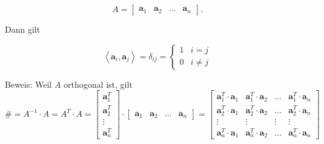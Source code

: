 \documentclass[10pt]{article}
\begin{document}
\[
A=\left[\begin{array}{llll}
\mathbf{a}_{1} & \mathbf{a}_{2} & \ldots & \mathbf{a}_{n} \tag{6.61}
\end{array}\right] .
\]

Dann gilt

\[
\left\langle\mathbf{a}_{i}, \mathbf{a}_{j}\right\rangle=\delta_{i j}=\left\{\begin{array}{l|l}
1 & i=j  \tag{6.62}\\
0 & i \neq j
\end{array}\right.
\]

Beweis: Weil $A$ orthogonal ist, gilt\\
$\mathbb{\#}=A^{-1} \cdot A=A^{T} \cdot A=\left[\begin{array}{c}\mathbf{a}_{1}^{T} \\ \mathbf{a}_{2}^{T} \\ \vdots \\ \mathbf{a}_{n}^{T}\end{array}\right] \cdot\left[\begin{array}{llll}\mathbf{a}_{1} & \mathbf{a}_{2} & \ldots & \mathbf{a}_{n}\end{array}\right]=\left[\begin{array}{cccc}\mathbf{a}_{1}^{T} \cdot \mathbf{a}_{1} & \mathbf{a}_{1}^{T} \cdot \mathbf{a}_{2} & \ldots & \mathbf{a}_{1}^{T} \cdot \mathbf{a}_{n} \\ \mathbf{a}_{2}^{T} \cdot \mathbf{a}_{1} & \mathbf{a}_{2}^{T} \cdot \mathbf{a}_{2} & \ldots & \mathbf{a}_{2}^{T} \cdot \mathbf{a}_{n} \\ \vdots & \vdots & \vdots & \vdots \\ \mathbf{a}_{n}^{T} \cdot \mathbf{a}_{1} & \mathbf{a}_{n}^{T} \cdot \mathbf{a}_{2} & \ldots & \mathbf{a}_{n}^{T} \cdot \mathbf{a}_{n}\end{array}\right]$
\end{document}
